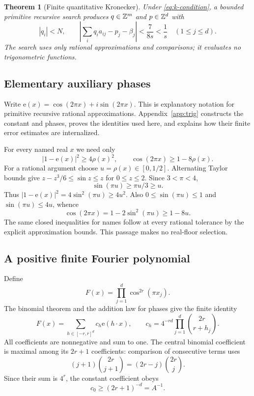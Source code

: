 \documentclass[11pt]{article}
\newtheorem{theorem}{Theorem}[section]
\theoremstyle{definition}\newtheorem{definition}[theorem]{Definition}
\theoremstyle{remark}\newtheorem{remark}[theorem]{Remark}
\newcommand{\e}{\mathrm e}\newcommand{\PR}{\mathrm{PR}}
\begin{document}
\begin{theorem}[Finite quantitative Kronecker]\label{thm:kronecker}
Under \eqref{eq:k-condition}, a bounded primitive recursive search produces $q\in\mathbb Z^m$ and $p\in\mathbb Z^d$ with
\[
 |q_i|<N,\qquad
 \left|\sum_iq_i a_{ij}-p_j-\beta_j\right|<\frac7{8s}<\frac1s
 \quad(1\le j\le d).
\]
The search uses only rational approximations and comparisons; it evaluates no trigonometric functions.
\end{theorem}

\subsection{Elementary auxiliary phases}

Write $\e(x)=\cos(2\pi x)+i\sin(2\pi x)$. This is explanatory notation for primitive recursive rational approximations. Appendix~\ref{app:trig} constructs the constant and phases, proves the identities used here, and explains how their finite error estimates are internalized.

For every named real $x$ we need only
\begin{equation}\label{eq:phase-estimates}
 |1-\e(x)|^2\ge4\rho(x)^2,
 \qquad \cos(2\pi x)\ge1-8\rho(x).
\end{equation}
For a rational argument choose $u=\rho(x)\in[0,1/2]$. Alternating Taylor bounds give $z-z^3/6\le\sin z\le z$ for $0\le z\le2$. Since $3<\pi<4$,
\[
 \sin(\pi u)\ge\pi u/3\ge u.
\]
Thus $|1-\e(x)|^2=4\sin^2(\pi u)\ge4u^2$. Also $0\le\sin(\pi u)\le1$ and $\sin(\pi u)\le4u$, whence
\[
 \cos(2\pi x)=1-2\sin^2(\pi u)\ge1-8u.
\]
The same closed inequalities for names follow at every rational tolerance by the explicit approximation bounds. This passage makes no real-floor selection.

\subsection{A positive finite Fourier polynomial}

Define
\[
 F(x)=\prod_{j=1}^d\cos^{2r}(\pi x_j).
\]
The binomial theorem and the addition law for phases give the finite identity
\begin{equation}\label{eq:fourier}
 F(x)=\sum_{h\in[-r,r]^d}c_h\e(h\cdot x),\qquad
 c_h=4^{-rd}\prod_{j=1}^d\binom{2r}{r+h_j}.
\end{equation}
All coefficients are nonnegative and sum to one. The central binomial coefficient is maximal among its $2r+1$ coefficients: comparison of consecutive terms uses
\[
 (j+1)\binom{2r}{j+1}=(2r-j)\binom{2r}{j}.
\]
Since their sum is $4^r$, the constant coefficient obeys
\begin{equation}\label{eq:constant}
 c_0\ge(2r+1)^{-d}=A^{-1}.
\end{equation}
\end{document}
